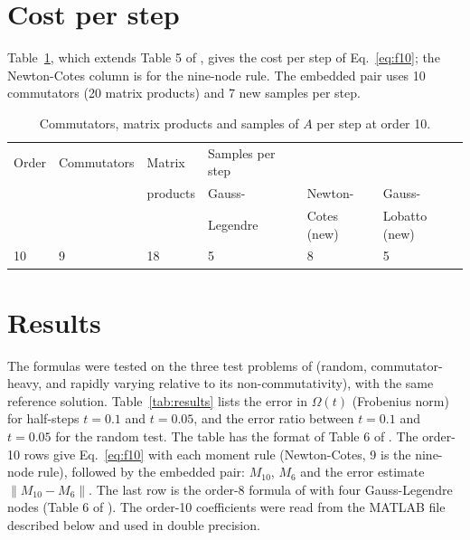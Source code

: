 \documentclass[12pt]{article}
\begin{document}
\section*{Cost per step}

Table~\ref{tab:cost}, which extends Table 5 of \cite{j28}, gives the cost per step of Eq.~\ref{eq:f10}; the Newton-Cotes column is for the nine-node rule. The embedded pair uses 10 commutators (20 matrix products) and 7 new samples per step.

\begin{table}[H]
\centering\small
\caption{Commutators, matrix products and samples of $A$ per step at order 10.}\label{tab:cost}
\begin{tabular}{llllll}
\hline
Order & Commutators & Matrix & Samples per step &  &  \\
 &  & products & Gauss- & Newton- & Gauss- \\
 &  &  & Legendre & Cotes (new) & Lobatto (new) \\ \hline
10 & 9 & 18 & 5 & 8 & 5 \\ \hline
\end{tabular}
\end{table}

\section*{Results}

The formulas were tested on the three test problems of \cite{j28} (random, commutator-heavy, and rapidly varying relative to its non-commutativity), with the same reference solution. Table~\ref{tab:results} lists the error in $\Omega(t)$ (Frobenius norm) for half-steps $t=0.1$ and $t=0.05$, and the error ratio between $t=0.1$ and $t=0.05$ for the random test. The table has the format of Table 6 of \cite{j28}. The order-10 rows give Eq.~\ref{eq:f10} with each moment rule (Newton-Cotes, 9 is the nine-node rule), followed by the embedded pair: $M_{10}$, $M_6$ and the error estimate $\|M_{10}-M_6\|$. The last row is the order-8 formula of \cite{j28} with four Gauss-Legendre nodes (Table 6 of \cite{j28}). The order-10 coefficients were read from the MATLAB file described below and used in double precision.
\end{document}
